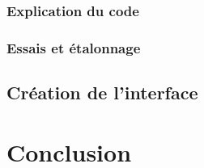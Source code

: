 	\subsubsection{Explication du code}
	
	\subsubsection{Essais et étalonnage}
	
\subsection{Création de l'interface}

\clearpage
\section{Conclusion}

